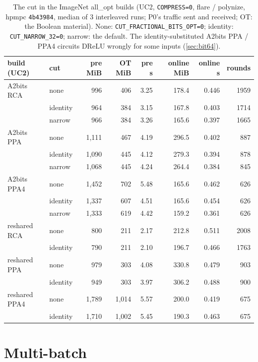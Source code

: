 \documentclass[10pt,a4paper]{article}
\newcommand{\flag}[1]{\nolinkurl{#1}}
\begin{document}
\begin{table}[t]
\centering\small
\begin{tabular}{@{}llrrrrrr@{}}
\toprule
build (UC2) & cut & pre MiB & OT MiB & pre s & online MiB & online s & rounds\\
\midrule
A2bits RCA & none & 996 & 406 & 3.25 & 178.4 & 0.446 & 1959\\
 & identity & 964 & 384 & 3.15 & 167.8 & 0.403 & 1714\\
 & narrow & 966 & 384 & 3.26 & 165.6 & 0.397 & 1665\\
A2bits PPA & none & 1{,}111 & 467 & 4.19 & 296.5 & 0.402 & 887\\
 & identity & 1{,}090 & 445 & 4.12 & 279.3 & 0.394 & 878\\
 & narrow & 1{,}068 & 445 & 4.24 & 264.4 & 0.384 & 845\\
A2bits PPA4 & none & 1{,}452 & 702 & 5.48 & 165.6 & 0.462 & 626\\
 & identity & 1{,}337 & 607 & 4.51 & 165.6 & 0.454 & 626\\
 & narrow & 1{,}333 & 619 & 4.42 & 159.2 & 0.361 & 626\\
\addlinespace
reshared RCA & none & 800 & 211 & 2.17 & 212.8 & 0.511 & 2008\\
 & identity & 790 & 211 & 2.10 & 196.7 & 0.466 & 1763\\
reshared PPA & none & 979 & 303 & 4.08 & 330.8 & 0.479 & 903\\
 & identity & 949 & 303 & 3.97 & 306.2 & 0.488 & 900\\
reshared PPA4 & none & 1{,}789 & 1{,}014 & 5.57 & 200.0 & 0.419 & 675\\
 & identity & 1{,}710 & 1{,}002 & 5.45 & 190.3 & 0.463 & 675\\
\bottomrule
\end{tabular}
\caption{The cut in the ImageNet all\_opt builds (UC2, \flag{COMPRESS=0}, flare / polynize, hpmpc \texttt{4b43984},
median of 3 interleaved runs; P0's traffic sent and received; OT: the Boolean material). None:
\flag{CUT_FRACTIONAL_BITS_OPT=0}; identity: \flag{CUT_NARROW_32=0}; narrow: the default. The identity-substituted
A2bits PPA / PPA4 circuits DReLU wrongly for some inputs (\cref{sec:bit64}).}
\label{tab:cutin}
\end{table}

\section{Multi-batch}\label{sec:multi}
\end{document}
